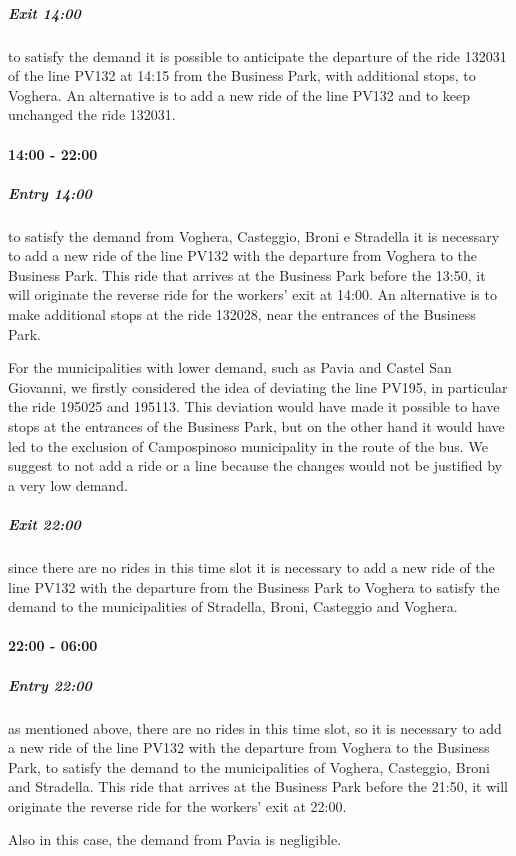 \subparagraph{Exit 14:00} to satisfy the demand it is possible to anticipate the departure of the ride 132031 of the line PV132 at 14:15 from the Business Park, with additional stops, to Voghera.
An alternative is to add a new ride of the line PV132 and to keep unchanged the ride 132031.

\paragraph{14:00 - 22:00}

\subparagraph{Entry 14:00} to satisfy the demand from Voghera, Casteggio, Broni e Stradella it is necessary to add a new ride of the line PV132 with the departure from Voghera to the Business Park. This ride that arrives at the Business Park before the 13:50, it will originate the reverse ride for the workers’ exit at 14:00.
An alternative is to make additional stops at the ride 132028, near the entrances of the Business Park.

For the municipalities with lower demand, such as Pavia and Castel San Giovanni, we firstly considered the idea of deviating the line PV195, in particular the ride 195025 and 195113. This deviation would have made it possible to have stops at the entrances of the Business Park, but on the other hand it would have led to the exclusion of Campospinoso municipality in the route of the bus. We suggest to not add a ride or a line because the changes would not be justified by a very low demand.

\subparagraph{Exit 22:00} since there are no rides in this time slot it is necessary to add a new ride of the line PV132 with the departure from the Business Park to Voghera to satisfy the demand to the municipalities of Stradella, Broni, Casteggio and Voghera.

\paragraph{22:00 - 06:00}

\subparagraph{Entry 22:00} as mentioned above, there are no rides in this time slot, so it is necessary to add a new ride of the line PV132 with the departure from Voghera to the Business Park, to satisfy the demand to the municipalities of Voghera, Casteggio, Broni and Stradella. This ride that arrives at the Business Park before the 21:50, it will originate the reverse ride for the workers’ exit at 22:00.

Also in this case, the demand from Pavia is negligible.

